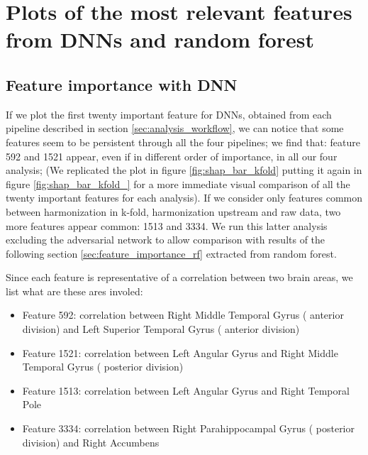 \documentclass[11pt]{report}
\begin{document}
\newpage
\section{Plots of the most relevant features from DNNs and random forest}
\subsection*{Feature importance with DNN}\label{sec:feature_importance_dnn} \hfill

If we plot the first twenty important feature for DNNs, obtained from each pipeline described in section \ref{sec:analysis_workflow}, we can notice that some features seem to be persistent through all the four pipelines; we find that: feature 592 and 1521 appear, even if in different order of importance, in all our four analysis;
(We replicated the plot in figure \ref{fig:shap_bar_kfold} putting it again in figure \ref{fig:shap_bar_kfold_} for a more immediate visual comparison of all the twenty important features for each analysis).
If we consider only features common between harmonization in k-fold, harmonization upstream and raw data, two more features appear common:  1513 and 3334.
We run this latter analysis excluding the adversarial network to allow comparison with results of the following section \ref{sec:feature_importance_rf} extracted from random forest.

Since each feature is representative of a correlation between two brain areas, we list what are these ares involed:
\begin{itemize}
\item Feature 592: correlation between Right Middle Temporal Gyrus ( anterior division) and Left Superior Temporal Gyrus ( anterior division)
\item Feature 1521: correlation between Left Angular Gyrus  and Right Middle Temporal Gyrus ( posterior division)
\item Feature 1513: correlation between Left Angular Gyrus  and Right Temporal Pole
\item Feature 3334: correlation between Right Parahippocampal Gyrus ( posterior division) and Right Accumbens

\end{itemize}
\end{document}
